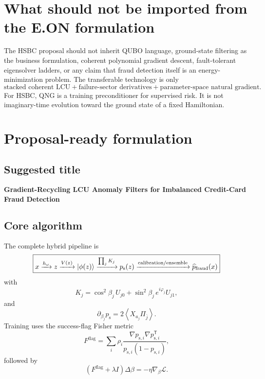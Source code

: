 \documentclass[11pt,a4paper]{article}
\newcommand{\psucc}{p_{\mathrm{s}}}
\newcommand{\pfraud}{p_{\mathrm{fraud}}}
\newcommand{\T}{\mathsf{T}}
\newcommand{\expect}[1]{\left\langle #1 \right\rangle}
\begin{document}
\section{What should not be imported from the E.ON formulation}

The HSBC proposal should not inherit QUBO language, ground-state filtering as the business formulation, coherent polynomial gradient descent, fault-tolerant eigensolver ladders, or any claim that fraud detection itself is an energy-minimization problem. The transferable technology is only
\begin{equation}
\boxed{
\text{stacked coherent LCU}
+
\text{failure-sector derivatives}
+
\text{parameter-space natural gradient}.
}
\end{equation}
For HSBC, QNG is a training preconditioner for supervised risk. It is not imaginary-time evolution toward the ground state of a fixed Hamiltonian.

\section{Proposal-ready formulation}

\subsection{Suggested title}

\begin{center}
\textbf{Gradient-Recycling LCU Anomaly Filters for Imbalanced Credit-Card Fraud Detection}
\end{center}

\subsection{Core algorithm}

The complete hybrid pipeline is
\begin{equation}
\boxed{
 x
 \xrightarrow{h_\omega}
 z
 \xrightarrow{V(z)}
 \ket{\phi(z)}
 \xrightarrow{\prod_j K_j}
 \psucc(z)
 \xrightarrow{\text{calibration/ensemble}}
 \widehat\pfraud(x)
}
\end{equation}
with
\begin{equation}
K_j
=\cos^2\beta_j\,U_{j0}
+\sin^2\beta_j\,e^{i\varphi_j}U_{j1},
\end{equation}
and
\begin{equation}
\partial_{\beta_j}\psucc
=2\expect{X_{a_j}\Pi_{\bar j}}.
\end{equation}
Training uses the success-flag Fisher metric
\begin{equation}
F^{\mathrm{flag}}
=\sum_i\rho_i
\frac{\nabla p_{\mathrm{s},i}\nabla p_{\mathrm{s},i}^{\T}}
{p_{\mathrm{s},i}(1-p_{\mathrm{s},i})},
\end{equation}
followed by
\begin{equation}
    (F^{\mathrm{flag}}+\lambda I)\Delta\beta
    =-\eta\nabla_\beta\mathcal L.
\end{equation}
\end{document}
